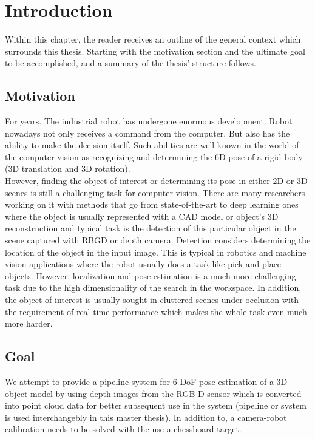 \chapter{Introduction}
\label{chap:intro}

Within this chapter, the reader receives an outline of the general context which surrounds this thesis. Starting with the motivation section and the ultimate goal to be accomplished, and a summary of the thesis' structure follows. 

\section{Motivation}

For years. The industrial robot has undergone enormous development. Robot nowadays not only receives a command from the computer. But also has the ability to make the decision itself. Such abilities are well known in the world of the computer vision as recognizing and determining the 6D pose of a rigid body (3D translation and 3D rotation). \\
However, finding the object of interest or determining its pose in either 2D or 3D scenes is still a challenging task for computer vision. There are many researchers working on it with methods that go from state-of-the-art to deep learning ones where the object is usually represented with a CAD model or object's 3D reconstruction and typical task is the detection of this particular object in the scene captured with RBGD or depth camera. Detection considers determining the location of the object in the input image. This is typical in robotics and machine vision applications where the robot usually does a task like pick-and-place objects. However, localization and pose estimation is a much more challenging task due to the high dimensionality of the search in the workspace. In addition, the object of interest is usually sought in cluttered scenes under occlusion with the requirement of real-time performance which makes the whole task even much more harder.

\section{Goal}
\iffalse
We attempt to provide a pipeline system for 6-DoF pose estimation of a 3D object model by using depth images from the RGB-D sensor which is converted into point cloud data for better subsequent use in the system (pipeline or system is used interchangebly in this master thesis). In addition to, a camera-robot calibration needs to be solved with the use a chessboard target.

